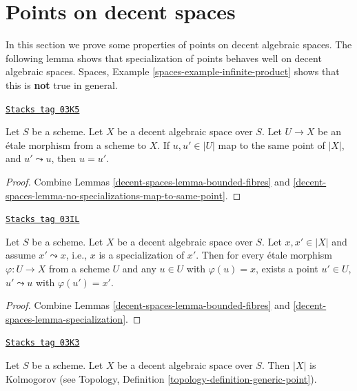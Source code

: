 \section{Points on decent spaces}
\label{decent-spaces-section-points}
In this section we prove some properties of points on decent algebraic spaces.
The following lemma shows that specialization of points behaves well
on decent algebraic spaces.
Spaces, Example \ref{spaces-example-infinite-product}
shows that this is {\bf not} true in general.

\begin{lemma}
\label{decent-spaces-lemma-decent-no-specializations-map-to-same-point}
\href{https://stacks.math.columbia.edu/tag/03K5}{\texttt{Stacks tag 03K5}}

Let $S$ be a scheme. Let $X$ be a decent algebraic space over $S$.
Let $U \to X$ be an \'etale morphism from a scheme to $X$.
If $u, u' \in |U|$ map to the same point of $|X|$, and
$u' \leadsto u$, then $u = u'$.
\end{lemma}

\begin{proof}
Combine Lemmas \ref{decent-spaces-lemma-bounded-fibres} and
\ref{decent-spaces-lemma-no-specializations-map-to-same-point}.
\end{proof}

\begin{lemma}
\label{decent-spaces-lemma-decent-specialization}
\href{https://stacks.math.columbia.edu/tag/03IL}{\texttt{Stacks tag 03IL}}

Let $S$ be a scheme. Let $X$ be a decent algebraic space over $S$.
Let $x, x' \in |X|$ and assume $x' \leadsto x$, i.e., $x$ is a
specialization of $x'$. Then for every \'etale morphism
$\varphi : U \to X$ from a scheme $U$ and any $u \in U$ with
$\varphi(u) = x$, exists a point $u'\in U$, $u' \leadsto u$ with
$\varphi(u') = x'$.
\end{lemma}

\begin{proof}
Combine Lemmas \ref{decent-spaces-lemma-bounded-fibres} and
\ref{decent-spaces-lemma-specialization}.
\end{proof}

\begin{lemma}[Kolmogorov]
\label{decent-spaces-lemma-kolmogorov}
\href{https://stacks.math.columbia.edu/tag/03K3}{\texttt{Stacks tag 03K3}}

Let $S$ be a scheme. Let $X$ be a decent algebraic space over $S$.
Then $|X|$ is Kolmogorov (see
Topology, Definition \ref{topology-definition-generic-point}).
\end{lemma}


